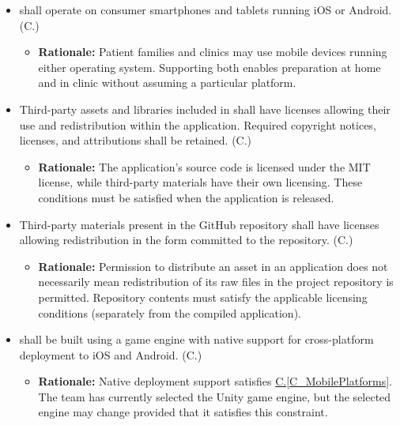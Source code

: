 \documentclass[12pt]{article}
\newcounter{connum} %
\newcommand{\conref}[1]{\hyperref[#1]{C.\ref*{#1}}}
\begin{document}
\begin{itemize}
    \item \progname{} shall operate on consumer smartphones and tablets running
    iOS or Android.
    (C.\theconnum\label{C_MobilePlatforms})
    \begin{itemize}
        \item \textbf{Rationale:} Patient families and clinics may use mobile devices running
        either operating system. Supporting both enables preparation
        at home and in clinic without assuming a particular platform.
    \end{itemize}

    \item Third-party assets and libraries included in \progname{} shall have
    licenses allowing their use and redistribution within the application.
    Required copyright notices, licenses, and attributions shall be retained.
    (C.\theconnum\label{C_ApplicationLicensing})
    \begin{itemize}
        \item \textbf{Rationale:} The application's source code is licensed under the
        MIT license, while third-party materials have their own licensing.
        These conditions must be satisfied when the application is released.
    \end{itemize}

    \item Third-party materials present in the \progname{} GitHub
    repository shall have licenses allowing redistribution in the form committed to the repository.
    (C.\theconnum\label{C_RepositoryLicensing})
    \begin{itemize}
        \item \textbf{Rationale:} Permission to distribute an asset in
        an application does not necessarily mean redistribution of its raw
        files in the project repository is permitted. Repository contents must satisfy
        the applicable licensing conditions (separately from the compiled application).
    \end{itemize}

    \item \progname{} shall be built using a game engine with native support
    for cross-platform deployment to iOS and Android.
    (C.\theconnum\label{C_CrossPlatformEngine})
    \begin{itemize}
        \item \textbf{Rationale:} Native deployment support satisfies \conref{C_MobilePlatforms}. The team has
        currently selected the Unity game engine, but the selected engine may
        change provided that it satisfies this constraint.
    \end{itemize}


\end{itemize}
\end{document}
